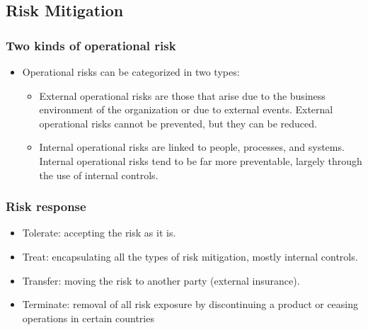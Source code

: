     
\subsection{Risk Mitigation}



\subsubsection{Two kinds of operational risk}
\begin{itemize}
\item Operational risks can be categorized in two types:
    \begin{itemize}
    \item External operational risks are those that arise due to the business environment of the organization or due to external events. External operational risks cannot be prevented, but they can be reduced.
    \item Internal operational risks are linked to people, processes, and systems. Internal operational risks tend to be far more preventable, largely through the use of internal controls.
    
    \end{itemize}
\end{itemize}


\subsubsection{Risk response}
\begin{itemize}
\item Tolerate: accepting the risk as it is.
\item Treat: encapsulating all the types of risk mitigation, mostly internal controls.
\item Transfer: moving the risk to another party (external insurance).
\item Terminate: removal of all risk exposure by discontinuing a product or ceasing operations in certain countries
\end{itemize}


